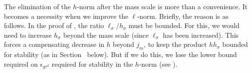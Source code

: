 \begin{rk}
The elimination of the $h$-norm after the mass scale is more than a convenience.
It becomes a necessity when we improve the $\ell$-norm.
Briefly, the reason is as follows. In the proof of
\cite[Lemma~\ref{step-lem:KKK}]{BS-rg-step}, the ratio
$\ell_{\sigma}/h_{\sigma}$
must be bounded. For this, we would need
to increase $h_{\sigma}$
beyond the mass scale  (since $\ell_{\sigma}$ has been increased).
This forces a compensating decrease in $h$
beyond $j_m$, to keep the product $hh_{\sigma}$ bounded for stability
(as in Section~\REF %
below). But if we do this, we lose the lower bound required on $\epsilon_{g\tau^2}$
required for stability in the $h$-norm (see \cite[\eqref{IE-e:epVbardefz-app}]{BS-rg-IE}).
\end{rk}

